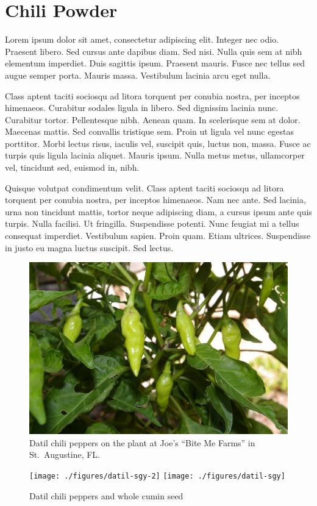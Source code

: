 \documentclass[12pt, draft]{book}
\begin{document}
\chapter{Chili Powder}
Lorem ipsum dolor sit amet, consectetur adipiscing elit. Integer nec odio. Praesent libero. Sed cursus ante dapibus diam. Sed nisi. Nulla quis sem at nibh elementum imperdiet. Duis sagittis ipsum. Praesent mauris. Fusce nec tellus sed augue semper porta. Mauris massa. Vestibulum lacinia arcu eget nulla. 

Class aptent taciti sociosqu ad litora torquent per conubia nostra, per inceptos himenaeos. Curabitur sodales ligula in libero. Sed dignissim lacinia nunc. Curabitur tortor. Pellentesque nibh. Aenean quam. In scelerisque sem at dolor. Maecenas mattis. Sed convallis tristique sem. Proin ut ligula vel nunc egestas porttitor. Morbi lectus risus, iaculis vel, suscipit quis, luctus non, massa. Fusce ac turpis quis ligula lacinia aliquet. Mauris ipsum. Nulla metus metus, ullamcorper vel, tincidunt sed, euismod in, nibh. 

Quisque volutpat condimentum velit. Class aptent taciti sociosqu ad litora torquent per conubia nostra, per inceptos himenaeos. Nam nec ante. Sed lacinia, urna non tincidunt mattis, tortor neque adipiscing diam, a cursus ipsum ante quis turpis. Nulla facilisi. Ut fringilla. Suspendisse potenti. Nunc feugiat mi a tellus consequat imperdiet. Vestibulum sapien. Proin quam. Etiam ultrices. Suspendisse in justo eu magna luctus suscipit. Sed lectus. 
\clearpage
\begin{figure}
\begin{center}
\includegraphics[height=0.5\textwidth]{./figures/datil-bite-me}
\end{center}
\caption*{Datil chili peppers on the plant at Joe's ``Bite Me Farms'' in St.\ Augustine, FL.}
\end{figure}

\begin{figure}
\begin{center}
\texttt{[image: ./figures/datil-sgy-2]}
\texttt{[image: ./figures/datil-sgy]}
\end{center}
\caption*{Datil chili peppers and whole cumin seed}
\end{figure}

\clearpage

\clearpage

\newpage

\newpage

\newpage

\end{document}
